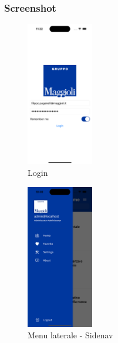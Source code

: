 \subsubsection*{Screenshot}
\begin{multicols}{3}
    \begin{figure}[H]
        \centering
        \includegraphics[width=0.26\textwidth]{img/Simulator Screen Shot - iPhone 14 Pro - 2022-10-05 at 11.22.08.png}
        \caption{Login}
        \label{login-ios}
    \end{figure}

    \begin{figure}[H]
        \centering
        \includegraphics[width=0.26\textwidth]{img/Simulator Screen Shot - iPhone 14 Pro - 2022-10-05 at 10.40.04.png}
        \caption{Menu laterale - Sidenav}
        \label{sidenav-ios}
    \end{figure}
    

\end{multicols}
